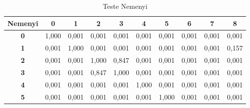 \begin{table}[H]
	\centering
	\caption{Teste Nemenyi}\label{tb:nemeyi}
	\begin{tabular}{@{}clllllllll@{}}
		\toprule
		\multicolumn{1}{l}{\textbf{Nemenyi}} & \multicolumn{1}{c}{\textbf{0}} & \multicolumn{1}{c}{\textbf{1}} & \multicolumn{1}{c}{\textbf{2}} & \multicolumn{1}{c}{\textbf{3}} & \multicolumn{1}{c}{\textbf{4}} & \multicolumn{1}{c}{\textbf{5}} & \multicolumn{1}{c}{\textbf{6}} & \multicolumn{1}{c}{\textbf{7}} & \multicolumn{1}{c}{\textbf{8}} \\ \midrule
		\textbf{0}                           & 1,000                          & 0,001                          & 0,001                          & 0,001                          & 0,001                          & 0,001                          & 0,001                          & 0,001                          & 0,001                          \\
		\textbf{1}                           & 0,001                          & 1,000                          & 0,001                          & 0,001                          & 0,001                          & 0,001                          & 0,001                          & 0,001                          & 0,157                          \\
		\textbf{2}                           & 0,001                          & 0,001                          & 1,000                          & 0,847                          & 0,001                          & 0,001                          & 0,001                          & 0,001                          & 0,001                          \\
		\textbf{3}                           & 0,001                          & 0,001                          & 0,847                          & 1,000                          & 0,001                          & 0,001                          & 0,001                          & 0,001                          & 0,001                          \\
		\textbf{4}                           & 0,001                          & 0,001                          & 0,001                          & 0,001                          & 1,000                          & 0,001                          & 0,001                          & 0,001                          & 0,001                          \\
		\textbf{5}                           & 0,001                          & 0,001                          & 0,001                          & 0,001                          & 0,001                          & 1,000                          & 0,001                          & 0,001                          & 0,001                          \\

\end{tabular}
\end{table}
